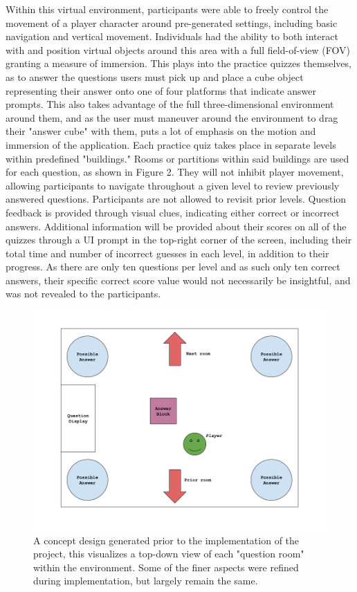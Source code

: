 \documentclass{vgtc}                          %
\begin{document}
Within this virtual environment, participants were able to freely control the movement of a player character around pre-generated settings, including basic navigation and vertical movement. Individuals had the ability to both interact with and position virtual objects around this area with a full field-of-view (FOV) granting a measure of immersion. This plays into the  practice quizzes themselves, as to answer the questions users must pick up and place a cube object representing their answer onto one of four platforms that indicate answer prompts. This also takes advantage of the full three-dimensional environment around them, and as the user must maneuver around the environment to drag their "answer cube" with them, puts a lot of emphasis on the motion and immersion of the application. Each practice quiz takes place in separate levels within predefined "buildings." Rooms or partitions within said buildings are used for each question, as shown in Figure 2. They will not inhibit player movement, allowing participants to navigate throughout a given level to review previously answered questions. Participants are not allowed to revisit prior levels. Question feedback is provided through visual clues, indicating either correct or incorrect answers. Additional information will be provided about their scores on all of the quizzes through a UI prompt in the top-right corner of the screen, including their total time and number of incorrect guesses in each level, in addition to their progress. As there are only ten questions per level and as such only ten correct answers, their specific correct score value would not necessarily be insightful, and was not revealed to the participants.

\begin{figure}[tb]
 \centering 
 \includegraphics[width=\linewidth]{Demo.png}
 \caption{A concept design generated prior to the implementation of the project, this visualizes a top-down view of each "question room" within the environment. Some of the finer aspects were refined during implementation, but largely remain the same.}
 \label{fig:sample}
\end{figure}
\end{document}
